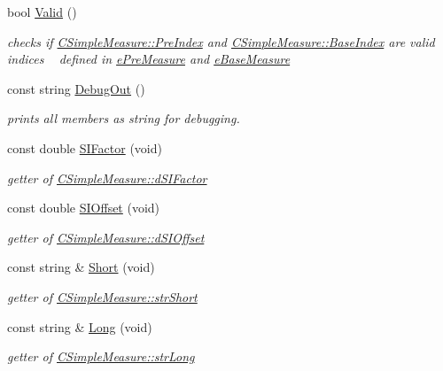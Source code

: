 \begin{DoxyCompactItemize}
bool \hyperlink{classCSimpleMeasure_ac4c8b1c22393c6d9a6381f3d8dfdf3e4}{Valid} ()
\begin{DoxyCompactList}\small\item\em checks if \hyperlink{classCSimpleMeasure_aa23ed9eec21adb9a97c90a424e7ee18a}{C\+Simple\+Measure\+::\+Pre\+Index} and \hyperlink{classCSimpleMeasure_a191dbfa4cc374946bf8a82111f827d92}{C\+Simple\+Measure\+::\+Base\+Index} are valid indices ~\newline
 defined in \hyperlink{PreMeasure_8h_a6c81167b8d4c2badde42f81cb7214620}{e\+Pre\+Measure} and \hyperlink{BaseMeasure_8h_ac90e5164ccf1f0d648fba7e94b229a11}{e\+Base\+Measure} \end{DoxyCompactList}\item 
const string \hyperlink{classCSimpleMeasure_a1031ddc7887dce1a739f38abe03601da}{Debug\+Out} ()
\begin{DoxyCompactList}\small\item\em prints all members as string for debugging. \end{DoxyCompactList}\item 
const double \hyperlink{classCSimpleMeasure_ad9c08324e46ef4eee5695e7ea1d00018}{S\+I\+Factor} (void)
\begin{DoxyCompactList}\small\item\em getter of \hyperlink{classCSimpleMeasure_a08be520f9d3a0e50cc63693f2fc607f2}{C\+Simple\+Measure\+::d\+S\+I\+Factor} \end{DoxyCompactList}\item 
const double \hyperlink{classCSimpleMeasure_a6e04ea2506105c069ae28650c5d69733}{S\+I\+Offset} (void)
\begin{DoxyCompactList}\small\item\em getter of \hyperlink{classCSimpleMeasure_a27c1637c744a79856ee81869e2aa8890}{C\+Simple\+Measure\+::d\+S\+I\+Offset} \end{DoxyCompactList}\item 
const string \& \hyperlink{classCSimpleMeasure_ab1e479ebf0d3a428ecd9f6b1daf3fe0c}{Short} (void)
\begin{DoxyCompactList}\small\item\em getter of \hyperlink{classCSimpleMeasure_a39260e6516c163955c34dce6795292ad}{C\+Simple\+Measure\+::str\+Short} \end{DoxyCompactList}\item 
const string \& \hyperlink{classCSimpleMeasure_a62d318d474f4feb9b25e113f47dd45c6}{Long} (void)
\begin{DoxyCompactList}\small\item\em getter of \hyperlink{classCSimpleMeasure_a5761fb46fb35ce577066ef1e7ec1ab2e}{C\+Simple\+Measure\+::str\+Long} \end{DoxyCompactList}\item 

\end{DoxyCompactItemize}
